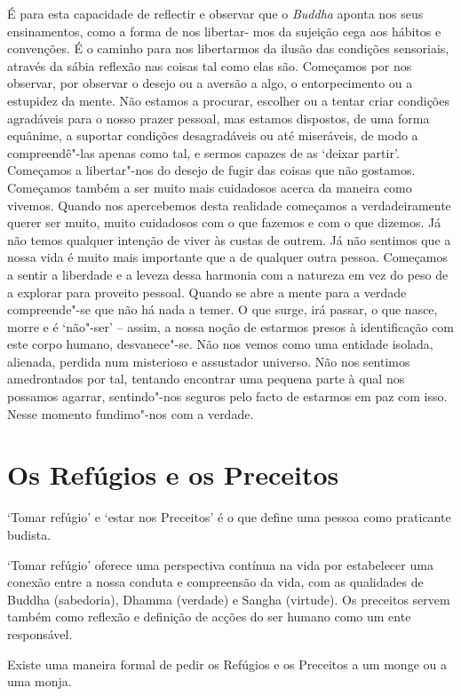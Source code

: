 É para esta capacidade de reflectir e observar que o \emph{Buddha}
aponta nos seus ensinamentos, como a forma de nos libertar- mos da
sujeição cega aos hábitos e convenções. É o caminho para nos libertarmos
da ilusão das condições sensoriais, através da sábia reflexão nas coisas
tal como elas são. Começamos por nos observar, por observar o desejo ou
a aversão a algo, o entorpecimento ou a estupidez da mente. Não
estamos a procurar, escolher ou a tentar criar condições agradáveis para
o nosso prazer pessoal, mas estamos dispostos, de uma forma equânime,
a suportar condições desagradáveis ou até miseráveis, de modo a
compreendê"-las apenas como tal, e sermos capazes de as `deixar partir'.
Começamos a libertar"-nos do desejo de fugir das coisas que não gostamos.
Começamos também a ser muito mais cuidadosos acerca da maneira como
vivemos. Quando nos apercebemos desta realidade começamos a
verdadeiramente querer ser muito, muito cuidadosos com o que fazemos e
com o que dizemos. Já não temos qualquer intenção de viver às custas de
outrem. Já não sentimos que a nossa vida é muito mais importante que a
de qualquer outra pessoa. Começamos a sentir a liberdade e a leveza
dessa harmonia com a natureza em vez do peso de a explorar para proveito
pessoal. Quando se abre a mente para a verdade compreende"-se que não há
nada a temer. O que surge, irá passar, o que nasce, morre e é `não"-ser'
-- assim, a nossa noção de estarmos presos à identificação com este
corpo humano, desvanece"-se. Não nos vemos como uma entidade isolada,
alienada, perdida num misterioso e assustador universo. Não nos sentimos
amedrontados por tal, tentando encontrar uma pequena parte à qual nos
possamos agarrar, sentindo"-nos seguros pelo facto de estarmos em paz com
isso. Nesse momento fundimo"-nos com a verdade.

\chapter{Os Refúgios e os Preceitos}

`Tomar refúgio' e `estar nos Preceitos' é o que define uma
pessoa como praticante budista.

`Tomar refúgio' oferece uma perspectiva contínua na vida por estabelecer
uma conexão entre a nossa conduta e compreensão da vida, com as
qualidades de Buddha (sabedoria), Dhamma (verdade) e Sangha (virtude).
Os preceitos servem também como reflexão e definição de acções do ser
humano como um ente responsável.

Existe uma maneira formal de pedir os Refúgios e os Preceitos a um monge
ou a uma monja.

